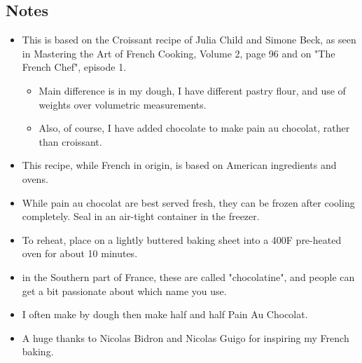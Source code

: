 \begin{multicols}{2}
\begin{enumerate}
\end{enumerate}

\subsection*{Notes}
\begin{itemize}
    \item This is based on the Croissant recipe of Julia Child and Simone Beck, as seen in Mastering the Art of French Cooking, Volume 2, page 96 and on "The French Chef", episode 1. 
    \begin{itemize}
        \item Main difference is in my  dough, I have different pastry flour, and use of weights over volumetric measurements.
        \item Also, of course, I have added chocolate to make pain au chocolat, rather than croissant.
    \end{itemize}
    \item This recipe, while French in origin, is based on American ingredients and ovens.
    \item While pain au chocolat are best served fresh, they can be frozen after cooling completely. Seal in an air-tight container in the freezer.
    \item To reheat, place on a lightly buttered baking sheet into a 400F pre-heated oven for about 10 minutes.
    \item in the Southern part of France, these are called "chocolatine", and people can get a bit passionate about which name you use.
    \item I often make by dough then make half  and half Pain Au Chocolat.
    \item A huge thanks to Nicolas Bidron and Nicolas Guigo for inspiring my French baking.
\end{itemize}
\end{multicols}
\clearpage